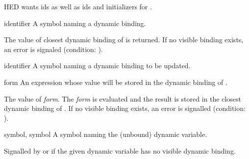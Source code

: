 \label{control-1}
%
\begin{optPrivate}
    HED wants ids as well as ids and initializers for .
\end{optPrivate}
%
\begin{optDefinition}
%
%
\Syntax
{}%
%
\begin{arguments}
    \item[identifier] A symbol naming a dynamic binding.
\end{arguments}
%
\result%
The value of closest dynamic binding of  is returned.  If no
visible binding exists, an error is signaled (condition:
).

%
\Syntax
{}%
%
\begin{arguments}
    \item[identifier] A symbol naming a dynamic binding to be updated.

    \item[form] An expression whose value will be stored in the dynamic binding
    of .
\end{arguments}
%
\result%
The value of {\em form}.
%
\remarks%
The {\em form} is evaluated and the result is stored in the closest dynamic
binding of .  If no visible binding exists, an error is
signalled (condition: 
).

%
\begin{initoptions}
    \item[symbol, symbol] A symbol naming the (unbound) dynamic variable.
\end{initoptions}
%
\remarks%
Signalled by  or  if the given
dynamic variable has no visible dynamic binding.


\end{optDefinition}
